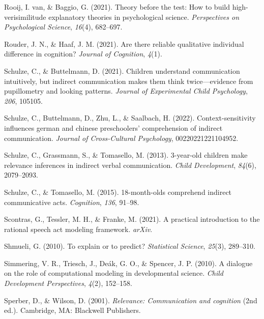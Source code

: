 \documentclass[
  man,floatsintext]{apa6}
\newlength{\cslhangindent}
\newlength{\cslentryspacingunit} %
\newenvironment{CSLReferences}[2] %
 {%
  \setlength{\parindent}{0pt}
  \ifodd #1
  \let\oldpar\par
  \def\par{\hangindent=\cslhangindent\oldpar}
  \fi
  \setlength{\parskip}{#2\cslentryspacingunit}
 }%
 {}
\begin{document}
\begin{CSLReferences}{1}{0}
\leavevmode{}%
Rooij, I. van, \& Baggio, G. (2021). Theory before the test: How to build high-verisimilitude explanatory theories in psychological science. \emph{Perspectives on Psychological Science}, \emph{16}(4), 682--697.

\leavevmode{}%
Rouder, J. N., \& Haaf, J. M. (2021). Are there reliable qualitative individual difference in cognition? \emph{Journal of Cognition}, \emph{4}(1).

\leavevmode{}%
Schulze, C., \& Buttelmann, D. (2021). Children understand communication intuitively, but indirect communication makes them think twice---evidence from pupillometry and looking patterns. \emph{Journal of Experimental Child Psychology}, \emph{206}, 105105.

\leavevmode{}%
Schulze, C., Buttelmann, D., Zhu, L., \& Saalbach, H. (2022). Context-sensitivity influences german and chinese preschoolers' comprehension of indirect communication. \emph{Journal of Cross-Cultural Psychology}, 00220221221104952.

\leavevmode{}%
Schulze, C., Grassmann, S., \& Tomasello, M. (2013). 3-year-old children make relevance inferences in indirect verbal communication. \emph{Child Development}, \emph{84}(6), 2079--2093.

\leavevmode{}%
Schulze, C., \& Tomasello, M. (2015). 18-month-olds comprehend indirect communicative acts. \emph{Cognition}, \emph{136}, 91--98.

\leavevmode{}%
Scontras, G., Tessler, M. H., \& Franke, M. (2021). A practical introduction to the rational speech act modeling framework. \emph{arXiv}.

\leavevmode{}%
Shmueli, G. (2010). To explain or to predict? \emph{Statistical Science}, \emph{25}(3), 289--310.

\leavevmode{}%
Simmering, V. R., Triesch, J., Deák, G. O., \& Spencer, J. P. (2010). A dialogue on the role of computational modeling in developmental science. \emph{Child Development Perspectives}, \emph{4}(2), 152--158.

\leavevmode{}%
Sperber, D., \& Wilson, D. (2001). \emph{Relevance: Communication and cognition} (2nd ed.). Cambridge, MA: Blackwell Publishers.


\end{CSLReferences}
\end{document}
